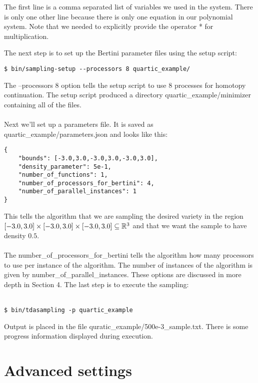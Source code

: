 \documentclass[11pt]{article}
\begin{document}
The first line is a comma separated list of variables we used in the system. There is only one other line because there is only one equation in our polynomial system. Note that we needed to explicitly provide the operator * for multiplication. 

The next step is to set up the Bertini parameter files using the setup script: 

\begin{verbatim}
$ bin/sampling-setup --processors 8 quartic_example/
\end{verbatim} 

The --processors 8 option tells the setup script to use 8 processes for homotopy 
continuation. The setup script produced a directory quartic\_example/minimizer containing 
all of the files. \\ \\
\noindent Next we'll set up a parameters file. It is saved as quartic\_example/parameters.json and looks like this: 

\begin{verbatim} 
{
	"bounds": [-3.0,3.0,-3.0,3.0,-3.0,3.0],
	"density_parameter": 5e-1,
	"number_of_functions": 1, 
	"number_of_processors_for_bertini": 4, 
	"number_of_parallel_instances": 1
}
\end{verbatim} 

This tells the algorithm that we are sampling the desired variety in the region $[-3.0,3.0] \times [-3.0,3.0] \times [-3.0,3.0] \subseteq \mathbb{R}^3$ and that we want the sample to have density $0.5$.\\ \\ 

The number\_of\_processors\_for\_bertini tells the algorithm how many processors to use per instance of the algorithm. The number of instances of the algorithm is given by number\_of\_parallel\_instances. These options are discussed in more depth in Section 4. The last step is to execute the sampling: \\ \\

\begin{verbatim} 
$ bin/tdasampling -p quartic_example
\end{verbatim} 

Output is placed in the file quratic\_example/500e-3\_sample.txt. There is some progress information displayed during execution. 

\section{Advanced settings}
\end{document}
